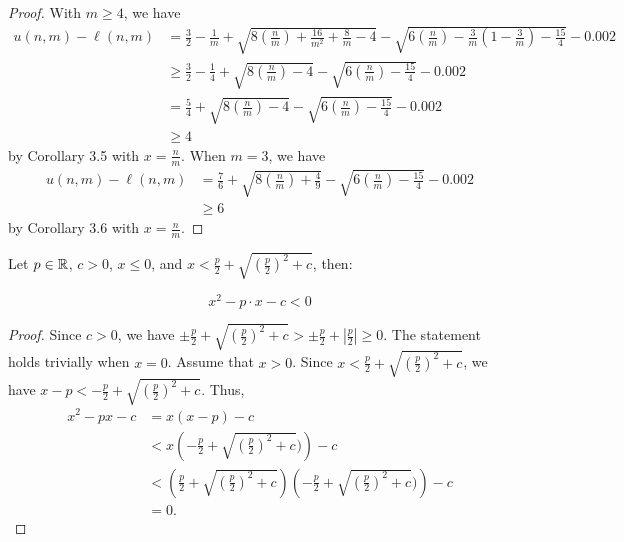 \begin{proof}
    \leanok
    With $m \geq 4$, we have
\begin{align*}
u(n,m)-\ell(n,m)
& =
 \frac{3}{2}-\frac{1}{m}+
\sqrt{8\left(\frac{n}{m}\right)+\frac{16}{m^2}+\frac{8}{m}-4} - 
\sqrt{6\left(\frac{n}{m}\right)-\frac{3}{m}\left(1-\frac{3}{m}\right)-\frac{15}{4}} - 0.002 \\
& \geq
 \frac{3}{2}-\frac{1}{4}+
\sqrt{8\left(\frac{n}{m}\right)-4} - 
\sqrt{6\left(\frac{n}{m}\right)-\frac{15}{4}} - 0.002 \\
& =
 \frac{5}{4}+
\sqrt{8\left(\frac{n}{m}\right)-4} - 
\sqrt{6\left(\frac{n}{m}\right)-\frac{15}{4}} - 0.002 \\
& \geq 4
\end{align*}
  by Corollary 3.5 with $x = \frac{n}{m}$.
When $m = 3$, we have
\begin{align*}
u(n,m) - \ell(n,m)
& = \frac{7}{6} + 
\sqrt{8\left(\frac{n}{m}\right) + \frac{4}{9}}
-\sqrt{6\left(\frac{n}{m}\right) - \frac{15}{4}} - 0.002 \\
& \geq 6
\end{align*}
  by Corollary 3.6 with $x = \frac{n}{m}$.
\end{proof}

\begin{lemma}[qub]
    \label{lem:qub}
    \leanok
    Let $p\in \mathbb{R}$, $c > 0$, $x\leq 0$, and $x< \frac{p}{2} + \sqrt{\left(\frac{p}{2}\right)^2 + c}$, then:

    \[
        x^2 - p \cdot x- c < 0
    \]
\end{lemma}

\begin{proof}
    \leanok
    Since $c > 0$, we have
    $\pm\frac{p}{2} + \sqrt{\left(\frac{p}{2}\right)^ 2 + c}
       > \pm\frac{p}{2} + \left\lvert\frac{p}{2}\right\rvert \geq 0.$
        The statement holds trivially when $x = 0$.
        Assume that $x > 0$.
        Since $x < \frac{p}{2} + \sqrt{\left(\frac{p}{2}\right)^ 2 + c}$, we have
        $x - p < -\frac{p}{2} + \sqrt{\left(\frac{p}{2}\right)^ 2 + c}$.
        Thus,
        \begin{align*}
        x^2 - px - c
        & = x(x - p) - c \\
        & < x\left(-\frac{p}{2}+\sqrt{\left(\frac{p}{2}\right)^ 2 + c})\right)-c \\
        & < \left(\frac{p}{2} + \sqrt{\left(\frac{p}{2}\right)^ 2 + c}\right)
        \left(-\frac{p}{2}+\sqrt{\left(\frac{p}{2}\right)^ 2 + c})\right) - c \\
        & = 0.
        \end{align*}
\end{proof}

